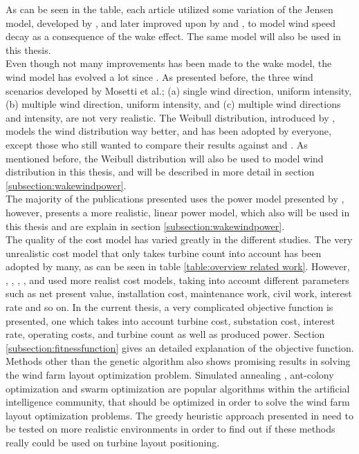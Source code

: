 \noindent As can be seen in the table, each article utilized some variation of the Jensen model, developed by \cite{Jensen}, and later improved upon by \cite{Katic} and \cite{Frandsen}, to model wind speed decay as a consequence of the wake effect. The same model will also be used in this thesis. \\

\noindent Even though not many improvements has been made to the wake model, the wind model has evolved a lot since \cite{Mosetti}. As presented before, the three wind scenarios developed by Mosetti et al.; (a) single wind direction, uniform intensity, (b) multiple wind direction, uniform intensity, and (c) multiple wind directions and intensity, are not very realistic. The Weibull distribution, introduced by \cite{Mora}, models the wind distribution way better, and has been adopted by everyone, except those who still wanted to compare their results against \cite{Mosetti} and \cite{Grady}. As mentioned before, the Weibull distribution will also be used to model wind distribution in this thesis, and will be described in more detail in section \ref{subsection:wakewindpower}. \\

\noindent The majority of the publications presented uses the power model presented by \cite{Mosetti}, however, \cite{Kusiak} presents a more realistic, linear power model, which also will be used in this thesis and are explain in section \ref{subsection:wakewindpower}.\\ 

\noindent The quality of the cost model has varied greatly in the different studies. The very unrealistic cost model that only takes turbine count into account has been adopted by many, as can be seen in table \ref{table:overview related work}. However, \citep{Mora}, \citep{Gonzalez}, \citep{Sisbot}, \citep{Saavedra-Morena}, and \citep{Chen} used more realist cost models, taking into account different parameters such as net present value, installation cost, maintenance work, civil work, interest rate and so on. In the current thesis, a very complicated objective function is presented, one which takes into account turbine cost, substation cost, interest rate, operating costs, and turbine count as well as produced power. Section \ref{subsection:fitnessfunction} gives an detailed explanation of the objective function. \\

\noindent Methods other than the genetic algorithm also shows promising results in solving the wind farm layout optimization problem. Simulated annealing \citep{Bilbao}, ant-colony optimization \citep{Eroglu} and swarm optimization \citep{Wan2012} are popular algorithms within the artificial intelligence community, that should be optimized in order to solve the wind farm layout optimization problems. The greedy heuristic approach presented in \citep{Ozturk} need to be tested on more realistic environments in order to find out if these methods really could be used on turbine layout positioning.\\

